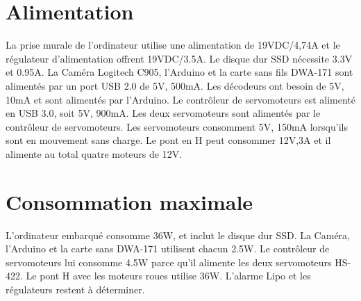 \section{Alimentation}
  La prise murale de l'ordinateur utilise une alimentation de 19VDC/4,74A et le régulateur d’alimentation offrent 19VDC/3.5A. Le disque dur SSD nécessite 3.3V et 0.95A. La Caméra Logitech C905, l’Arduino et la carte sans fils DWA-171 sont alimentés par un port USB 2.0 de 5V, 500mA. Les décodeurs ont besoin de 5V, 10mA et sont alimentés par l’Arduino. Le contrôleur de servomoteurs est alimenté en USB 3.0, soit 5V, 900mA. Les deux servomoteurs sont alimentés par le contrôleur de servomoteurs. Les servomoteurs consomment 5V, 150mA lorsqu’ils sont en mouvement sans charge. Le pont en H peut consommer 12V,3A et il alimente au total quatre moteurs de 12V.

\section{Consommation maximale}
L’ordinateur embarqué consomme 36W, et inclut le disque dur SSD. La Caméra, l’Arduino et la carte sans DWA-171 utilisent chacun 2.5W. Le contrôleur de servomoteurs lui consomme 4.5W parce qu’il alimente les deux servomoteurs HS-422. Le pont H avec les moteurs roues utilise 36W. L’alarme Lipo et les régulateurs restent à déterminer. 
